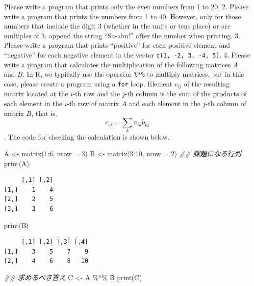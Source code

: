 \documentclass[
  a4paper,
]{book}
\newenvironment{Shaded}{\begin{snugshade}}{\end{snugshade}}
\newcommand{\AttributeTok}[1]{\textcolor[rgb]{0.40,0.45,0.13}{#1}}
\newcommand{\DecValTok}[1]{\textcolor[rgb]{0.68,0.00,0.00}{#1}}
\newcommand{\DocumentationTok}[1]{\textcolor[rgb]{0.37,0.37,0.37}{\textit{#1}}}
\newcommand{\FunctionTok}[1]{\textcolor[rgb]{0.28,0.35,0.67}{#1}}
\newcommand{\NormalTok}[1]{\textcolor[rgb]{0.00,0.23,0.31}{#1}}
\newcommand{\OtherTok}[1]{\textcolor[rgb]{0.00,0.23,0.31}{#1}}
\newcommand{\SpecialCharTok}[1]{\textcolor[rgb]{0.37,0.37,0.37}{#1}}
\begin{document}
Please write a program that prints only the even numbers from 1 to 20.
2. Please write a program that prints the numbers from 1 to 40. However,
only for those numbers that include the digit 3 (whether in the units or
tens place) or are multiples of 3, append the string ``Sa-ahn!'' after
the number when printing. 3. Please write a program that prints
``positive'' for each positive element and ``negative'' for each
negative element in the vector \texttt{c(1,\ -2,\ 3,\ -4,\ 5)}. 4.
Please write a program that calculates the multiplication of the
following matrices \(A\) and \(B\). In R, we typically use the operator
\texttt{\%*\%} to multiply matrices, but in this case, please create a
program using a \texttt{for} loop. Element \(c_{ij}\) of the resulting
matrix located at the \(i\)-th row and the \(j\)-th column is the sum of
the products of each element in the \(i\)-th row of matrix \(A\) and
each element in the \(j\)-th column of matrix \(B\), that is,
\[c_{ij}=\sum_{k} a_{ik}b_{kj}\]. The code for checking the calculation
is shown below.

\begin{Shaded}
\begin{Highlighting}[]
\NormalTok{A }\OtherTok{\textless{}{-}} \FunctionTok{matrix}\NormalTok{(}\DecValTok{1}\SpecialCharTok{:}\DecValTok{6}\NormalTok{, }\AttributeTok{nrow =} \DecValTok{3}\NormalTok{)}
\NormalTok{B }\OtherTok{\textless{}{-}} \FunctionTok{matrix}\NormalTok{(}\DecValTok{3}\SpecialCharTok{:}\DecValTok{10}\NormalTok{, }\AttributeTok{nrow =} \DecValTok{2}\NormalTok{)}
\DocumentationTok{\#\# 課題になる行列}
\FunctionTok{print}\NormalTok{(A)}
\end{Highlighting}
\end{Shaded}

\begin{verbatim}
     [,1] [,2]
[1,]    1    4
[2,]    2    5
[3,]    3    6
\end{verbatim}

\begin{Shaded}
\begin{Highlighting}[]
\FunctionTok{print}\NormalTok{(B)}
\end{Highlighting}
\end{Shaded}

\begin{verbatim}
     [,1] [,2] [,3] [,4]
[1,]    3    5    7    9
[2,]    4    6    8   10
\end{verbatim}

\begin{Shaded}
\begin{Highlighting}[]
\DocumentationTok{\#\# 求めるべき答え}
\NormalTok{C }\OtherTok{\textless{}{-}}\NormalTok{ A }\SpecialCharTok{\%*\%}\NormalTok{ B}
\FunctionTok{print}\NormalTok{(C)}
\end{Highlighting}
\end{Shaded}
\end{document}
